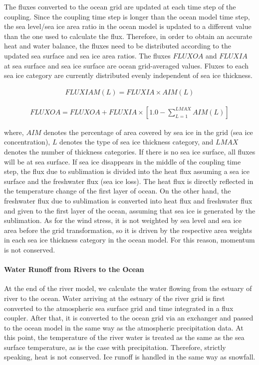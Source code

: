 The fluxes converted to the ocean grid are updated at each time step of
the coupling. Since the coupling time step is longer than the ocean
model time step, the sea level/sea ice area ratio in the ocean model is
updated to a different value than the one used to calculate the flux.
Therefore, in order to obtain an accurate heat and water balance, the
fluxes need to be distributed according to the updated sea surface and
sea ice area ratios. The fluxes \(FLUXOA\) and \(FLUXIA\) at sea surface
and sea ice surface are ocean grid-averaged values. Fluxes to each sea
ice category are currently distributed evenly independent of sea ice
thickness.

\begin{eqnarray} FLUXIAM(L)=FLUXIA \times AIM(L)\end{eqnarray}

\begin{eqnarray} FLUXOA=FLUXOA+FLUXIA \times [1.0-\sum_{L=1}^{LMAX}AIM(L)]\end{eqnarray}

where, \(AIM\) denotes the percentage of area covered by sea ice in the
grid (sea ice concentration), \(L\) denotes the type of sea ice
thickness category, and \(LMAX\) denotes the number of thickness
categories. If there is no sea ice surface, all fluxes will be at sea
surface. If sea ice disappears in the middle of the coupling time step,
the flux due to sublimation is divided into the heat flux assuming a sea
ice surface and the freshwater flux (sea ice loss). The heat flux is
directly reflected in the temperature change of the first layer of
ocean. On the other hand, the freshwater flux due to sublimation is
converted into heat flux and freshwater flux and given to the first
layer of the ocean, assuming that sea ice is generated by the
sublimation. As for the wind stress, it is not weighted by sea level and
sea ice area before the grid transformation, so it is driven by the
respective area weights in each sea ice thickness category in the ocean
model. For this reason, momentum is not conserved.

\hypertarget{water-runoff-from-rivers-to-the-ocean}{%
\paragraph{Water Runoff from Rivers to the
Ocean}\label{water-runoff-from-rivers-to-the-ocean}}

At the end of the river model, we calculate the water flowing from the
estuary of river to the ocean. Water arriving at the estuary of the
river grid is first converted to the atmospheric sea surface grid and
time integrated in a flux coupler. After that, it is converted to the
ocean grid via an exchanger and passed to the ocean model in the same
way as the atmospheric precipitation data. At this point, the
temperature of the river water is treated as the same as the sea surface
temperature, as is the case with precipitation. Therefore, strictly
speaking, heat is not conserved. Ice runoff is handled in the same way
as snowfall.

